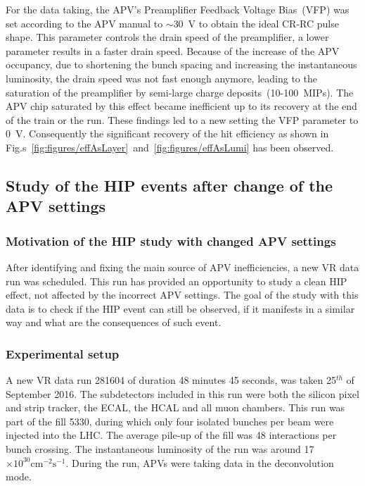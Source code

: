 For the data taking, the APV's Preamplifier Feedback Voltage Bias~(VFP) was set according to the APV manual to $\sim$30~V to obtain the ideal CR-RC pulse shape. This parameter controls the drain speed of the preamplifier, a lower parameter results in a faster drain speed. Because of the increase of the APV occupancy, due to shortening the bunch spacing and increasing the instantaneous luminosity, the drain speed was not fast enough anymore, leading to the saturation of the preamplifier by semi-large charge deposits~(10-100~MIPs). The APV chip saturated by this effect became inefficient up to its recovery at the end of the train or the run. These findings led to a new setting the VFP parameter to 0~V. Consequently the significant recovery of the hit efficiency as shown in Fig.s~\ref{fig:figures/effAsLayer}~and~\ref{fig:figures/effAsLumi} has been observed.


\subsection{Study of the HIP events after change of the APV settings}

\subsubsection{Motivation of the HIP study with changed APV settings}

After identifying and fixing the main source of APV inefficiencies, a new VR data run was scheduled. This run has provided an opportunity to study a clean HIP effect, not affected by the incorrect APV settings. The goal of the study with this data is to check if the HIP event can still be observed, if it manifests in a similar way and what are the consequences of such event.


\subsubsection{Experimental setup}

A new VR data run 281604 of duration 48 minutes 45 seconds, was taken 25$^{th}$ of September 2016. The subdetectors included in this run were both the silicon pixel and strip tracker, the ECAL, the HCAL and all muon chambers. This run was part of the fill 5330, during which only four isolated bunches per beam were injected into the LHC. The average pile-up of the fill was 48 interactions per bunch crossing. The instantaneous luminosity of the run was around 17$\times 10^{30} \mathrm{cm^{-2} s^{-1}}$. During the run, APVs were taking data in the deconvolution mode. 


